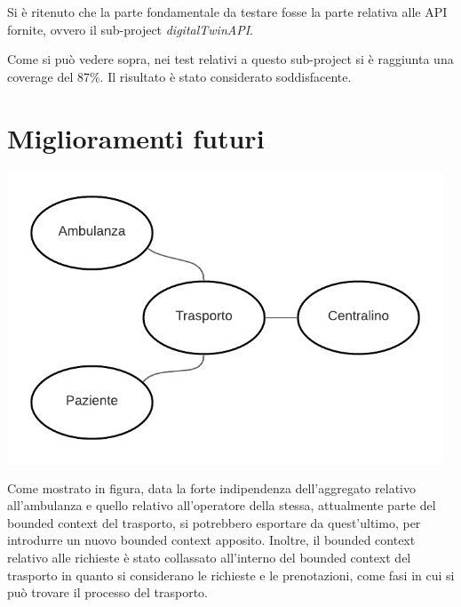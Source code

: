 \documentclass[12pt]{article}
\begin{document}
Si è ritenuto che la parte fondamentale da testare fosse la parte relativa alle API fornite, ovvero il sub-project \textit{digitalTwinAPI}. 

Come si può vedere sopra, nei test relativi a questo sub-project si è raggiunta una coverage del 87\%. Il risultato è stato considerato soddisfacente.

\section{Miglioramenti futuri}

\centerline{\includegraphics[width=13cm]{fig/ContextMap2.png}}
Come mostrato in figura, data la forte indipendenza dell'aggregato relativo all'ambulanza e quello relativo all'operatore della stessa, attualmente parte del bounded context del trasporto, si potrebbero esportare da quest'ultimo, per introdurre un nuovo bounded context apposito.
Inoltre, il bounded context relativo alle richieste è stato collassato all'interno del bounded context del trasporto in quanto si considerano le richieste e le prenotazioni, come fasi in cui si può trovare il processo del trasporto.
\end{document}
